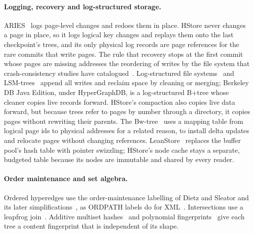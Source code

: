 \paragraph{Logging, recovery and log-structured storage.} ARIES~\cite{aries} logs page-level changes and redoes them in place. HStore never changes a page in place, so it logs logical key changes and replays them onto the last checkpoint's trees, and its only physical log records are page references for the rare commits that write pages. The rule that recovery stops at the first commit whose pages are missing addresses the reordering of writes by the file system that crash-consistency studies have catalogued~\cite{pillai,torturing}. Log-structured file systems~\cite{lfs} and LSM-trees~\cite{lsm} append all writes and reclaim space by cleaning or merging; Berkeley DB Java Edition, under HyperGraphDB, is a log-structured B+tree whose cleaner copies live records forward. HStore's compaction also copies live data forward, but because trees refer to pages by number through a directory, it copies pages without rewriting their parents. The Bw-tree~\cite{bwtree} uses a mapping table from logical page ids to physical addresses for a related reason, to install delta updates and relocate pages without changing references. LeanStore~\cite{leanstore} replaces the buffer pool's hash table with pointer swizzling; HStore's node cache stays a separate, budgeted table because its nodes are immutable and shared by every reader.

\paragraph{Order maintenance and set algebra.} Ordered hyperedges use the order-maintenance labelling of Dietz and Sleator and its later simplifications~\cite{dietz-sleator,bender-order}, as ORDPATH labels do for XML~\cite{ordpath}. Intersections use a leapfrog join~\cite{leapfrog}. Additive multiset hashes~\cite{multiset-hash} and polynomial fingerprints~\cite{karp-rabin} give each tree a content fingerprint that is independent of its shape.
